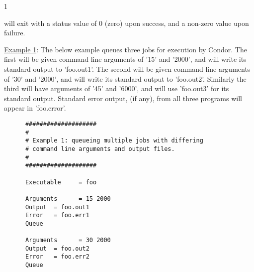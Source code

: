 \begin{ManPage}{\label{man-condor-submit}}{1}
\begin{Options}

\end{Options}

\ExitStatus

 will exit with a status value of 0 (zero) upon success, and a
non-zero value upon failure.

\Examples

\underline{Example 1}: The below example queues three jobs for
execution by Condor. The first will be given command line arguments of
'15' and '2000', and will write its standard output to 'foo.out1'. The
second will be given command line arguments of '30' and '2000', and will
write its standard output to 'foo.out2'. Similarly the third will have
arguments of '45' and '6000', and will use 'foo.out3' for its standard
output. Standard error output, (if any), from all three programs will
appear in 'foo.error'.

\begin{verbatim}
      ####################
      #
      # Example 1: queueing multiple jobs with differing
      # command line arguments and output files.
      #                                                                      
      ####################                                                   
                                                                         
      Executable     = foo                                                   
                                                                         
      Arguments      = 15 2000                                               
      Output  = foo.out1                                                     
      Error   = foo.err1
      Queue                                                                  
                                                                         
      Arguments      = 30 2000                                               
      Output  = foo.out2                                                     
      Error   = foo.err2
      Queue                                                                  
                                                                         

\end{verbatim}
\end{ManPage}
